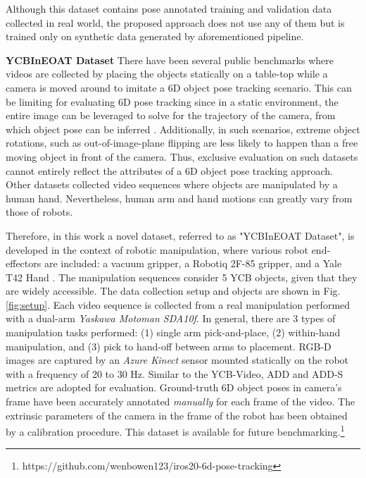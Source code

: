 \documentclass[letterpaper, 10 pt, conference]{ieeeconf}
\begin{document}
Although this dataset contains pose annotated training and validation data collected in real world, the proposed approach does not use any of them but is trained only on synthetic data generated by aforementioned pipeline.

\noindent \textbf{YCBInEOAT Dataset} There have been several public benchmarks \cite{xiang2017posecnn,choi2013rgb} where videos are collected by placing the objects statically on a table-top while a camera is moved around to imitate a 6D object pose tracking scenario. This can be limiting for evaluating 6D pose tracking since in a static environment, the entire image can be leveraged to solve for the trajectory of the camera, from which object pose can be inferred \cite{mur2015orb, hodan2017tless}. Additionally, in such scenarios, extreme object rotations, such as out-of-image-plane flipping are less likely to happen than a free moving object in front of the camera. Thus, exclusive evaluation on such datasets cannot entirely reflect the attributes of a 6D object pose tracking approach. Other datasets \cite{issac2016depth, krull20146} collected video sequences where objects are manipulated by a human hand. Nevertheless, human arm and hand motions can greatly vary from those of robots.

Therefore, in this work a novel dataset, referred to as "YCBInEOAT Dataset", is developed in the context of robotic manipulation, where various robot end-effectors are included: a vacuum gripper, a Robotiq 2F-85 gripper, and a Yale T42 Hand \cite{odhner2013open}. The manipulation sequences consider 5 YCB objects, given that they are widely accessible. The data collection setup and objects are shown in Fig. \ref{fig:setup}. Each video sequence is collected from a real manipulation performed with a dual-arm {\it Yaskawa Motoman SDA10f}. In general, there are 3 types of manipulation tasks performed: (1) single arm pick-and-place, (2) within-hand manipulation, and (3) pick to hand-off between arms to placement. RGB-D images are captured by an {\it Azure Kinect} sensor mounted statically on the robot with a frequency of 20 to 30 Hz. Similar to the YCB-Video, ADD and ADD-S metrics are adopted for evaluation. Ground-truth 6D object poses in camera's frame have been accurately annotated \emph{manually} for each frame of the video. The extrinsic parameters of the camera in the frame of the robot has been obtained by a calibration procedure. This dataset is available for future benchmarking.\footnote{https://github.com/wenbowen123/iros20-6d-pose-tracking}
\end{document}

